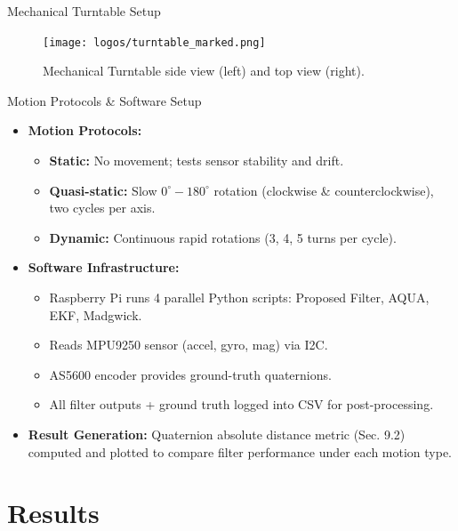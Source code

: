 \documentclass[aspectratio=169,xcolor=dvipsnames]{beamer}
\begin{document}
  \begin{frame}{Mechanical Turntable Setup}
  \begin{figure}
    \centering
    \texttt{[image: logos/turntable\_marked.png]}  
    \caption{Mechanical Turntable side view (left) and top view (right).}    
    \label{fig:turntable}
  \end{figure}
  \end{frame}
  
  
  \begin{frame}{Motion Protocols \& Software Setup}
  \begin{itemize}
      \item \textbf{Motion Protocols:}
      \begin{itemize}
          \item \textbf{Static:} No movement; tests sensor stability and drift.  
          \item \textbf{Quasi-static:} Slow $0^{\circ}\!\!-\!180^{\circ}$ rotation (clockwise \& counterclockwise), two cycles per axis.  
          \item \textbf{Dynamic:} Continuous rapid rotations (3, 4, 5 turns per cycle).
      \end{itemize}
  
      \item \textbf{Software Infrastructure:}  
      \begin{itemize}
          \item Raspberry Pi runs 4 parallel Python scripts: Proposed Filter, AQUA, EKF, Madgwick.  
          \item Reads MPU9250 sensor (accel, gyro, mag) via I2C.  
          \item AS5600 encoder provides ground-truth quaternions.  
          \item All filter outputs + ground truth logged into CSV for post-processing.
      \end{itemize}
  
      \item \textbf{Result Generation:}  
      Quaternion absolute distance metric (Sec. 9.2) computed and plotted to compare filter performance under each motion type.
  \end{itemize}
  \end{frame}

\section{Results}
\end{document}
